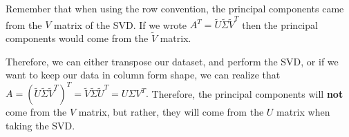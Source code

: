 \begin{enumerate}
{    Remember that when using the row convention, the principal components came from the $V$ matrix of the SVD. 
    If we wrote $A^{T} = \tilde{U} \tilde{\Sigma} \tilde{V}^{T}$ then the principal components would come from the $\tilde{V}$ matrix. 

    Therefore, we can either transpose our dataset, and perform the SVD, or if we want to keep our data in column form shape, we can realize that $A = (\tilde{U} \tilde{\Sigma} \tilde{V}^{T})^{T} = \tilde{V} \tilde{\Sigma} \tilde{U}^{T} = U \Sigma V^{T}.$
    Therefore, the principal components will \textbf{not} come from the $V$ matrix, but rather, they will come from the $U$ matrix when taking the SVD.
	}

\end{enumerate}